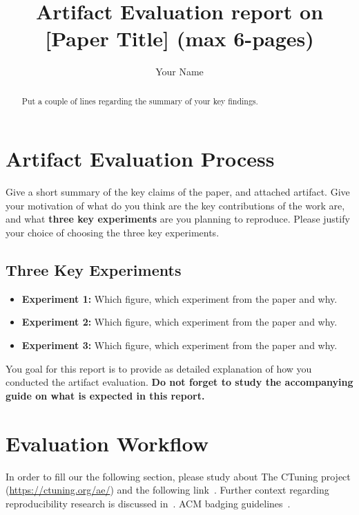 \documentclass[sigconf,10pt, screen]{acmart}
\begin{document}
\title{Artifact Evaluation report on [Paper Title] (max 6-pages)}
\author{Your Name}
\begin{abstract}
Put a couple of lines regarding the summary of your key findings. 
\end{abstract}

\maketitle

\section{Artifact Evaluation Process}
Give a short summary of the key claims of the paper, and attached artifact. Give your motivation of what do you think are the key contributions of the work are, and what \textbf{three key experiments} are you planning to reproduce. Please justify your choice of choosing the three key experiments. 
\subsection{Three Key Experiments}
\begin{itemize}
    \item \textbf{Experiment 1:} Which figure, which experiment from the paper and why.
    \item \textbf{Experiment 2:} Which figure, which experiment from the paper and why.
    \item \textbf{Experiment 3:} Which figure, which experiment from the paper and why.
\end{itemize}

You goal for this report is to provide as detailed explanation of how you conducted the artifact evaluation. \textbf{Do not forget to study the accompanying guide on what is expected in this report.}

\section{Evaluation Workflow}

In order to fill our the following section, please study about The CTuning project (\url{https://ctuning.org/ae/}) and the following link~\cite{2023-ae-checklist}. Further context regarding reproducibility research is discussed in~\cite{2017-cacm-notes-repro,2020-sigcomm-rev-badging,2023-sigops-ae-notes,2023-sigplan-ae-guidelines}. ACM badging guidelines~\cite{2023-acm-badge}.
\end{document}

